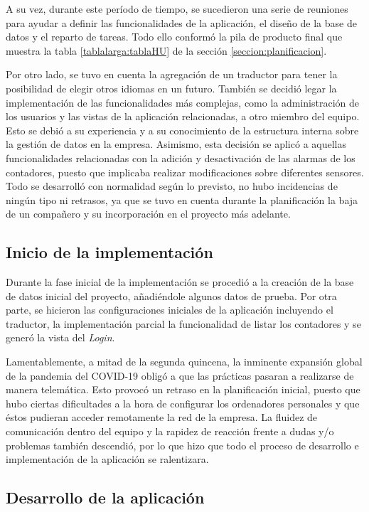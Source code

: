 \documentclass[pdftex,11pt,a4paper]{book}
\begin{document}
A su vez, durante este período de tiempo, se sucedieron una serie de reuniones para ayudar a definir las funcionalidades de la aplicación, el diseño de la base de datos y el reparto de tareas. Todo ello conformó la pila de producto final que muestra la tabla \ref{tablalarga:tablaHU} de la sección \ref{seccion:planificacion}. 

Por otro lado, se tuvo en cuenta la agregación de un traductor para tener la posibilidad de elegir otros idiomas en un futuro. También se decidió legar la implementación de las funcionalidades más complejas, como la administración de los usuarios y las vistas de la aplicación relacionadas, a otro miembro del equipo. Esto se debió a su experiencia y a su conocimiento de la estructura interna sobre la gestión de datos en la empresa. Asimismo, esta decisión se aplicó a aquellas funcionalidades relacionadas con la adición y desactivación de las alarmas de los contadores, puesto que implicaba realizar modificaciones sobre diferentes sensores. 
Todo se desarrolló con normalidad según lo previsto, no hubo incidencias de ningún tipo ni retrasos, ya que se tuvo en cuenta durante la planificación la baja de un compañero y su incorporación en el proyecto más adelante.

\subsection{Inicio de la implementación}

Durante la fase inicial de la implementación se procedió a la creación de la base de datos inicial del proyecto, añadiéndole algunos datos de prueba. Por otra parte, se hicieron las configuraciones iniciales de la aplicación incluyendo el traductor, la implementación parcial la funcionalidad de listar los contadores y se generó la vista del \textit{Login}. 

Lamentablemente, a mitad de la segunda quincena, la inminente expansión global de la pandemia del COVID-19 obligó a que las prácticas pasaran a realizarse de manera telemática. Esto provocó un retraso en la planificación inicial, puesto que hubo ciertas dificultades a la hora de configurar los ordenadores personales y que éstos pudieran acceder remotamente la red de la empresa. La fluidez de comunicación dentro del equipo y la rapidez de reacción frente a dudas y/o problemas también descendió, por lo que hizo que todo el proceso de desarrollo e implementación de la aplicación se ralentizara. 

\subsection{Desarrollo de la aplicación}
\end{document}
